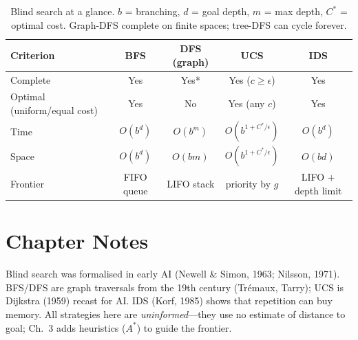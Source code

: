 \begin{table}[h]
\centering\small
\begin{tabular}{lcccc}
\toprule
Criterion & BFS & DFS (graph) & UCS & IDS \\
\midrule
Complete & Yes & Yes* & Yes ($c\!\ge\!\epsilon$) & Yes \\
Optimal (uniform/equal cost) & Yes & No & Yes (any $c$) & Yes \\
Time & $O(b^d)$ & $O(b^m)$ & $O(b^{1+C^*/\epsilon})$ & $O(b^d)$ \\
Space & $O(b^d)$ & $O(bm)$ & $O(b^{1+C^*/\epsilon})$ & $O(bd)$ \\
Frontier & FIFO queue & LIFO stack & priority by $g$ & LIFO + depth limit \\
\bottomrule
\end{tabular}
\caption{Blind search at a glance. $b$ = branching, $d$ = goal depth, $m$ = max depth, $C^*$ = optimal cost. {\footnotesize *Graph-DFS complete on finite spaces; tree-DFS can cycle forever.}}
\label{tab:uninformed-compare}
\end{table}

\section{Chapter Notes}
Blind search was formalised in early AI (Newell \& Simon, 1963; Nilsson, 1971). BFS/DFS are graph traversals from the 19th century (Tr\'emaux, Tarry); UCS is Dijkstra (1959) recast for AI. IDS (Korf, 1985) shows that repetition can buy memory. All strategies here are \emph{uninformed}---they use no estimate of distance to goal; Ch.~3 adds heuristics ($A^*$) to guide the frontier.

